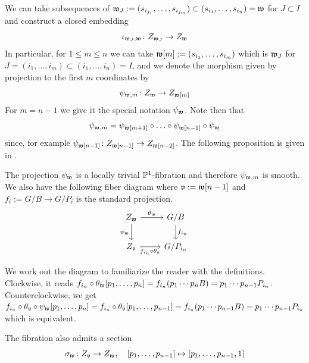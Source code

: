 \documentclass[12pt]{article}
\begin{document}
We can take subsequences of $\mathfrak{w}_J := (s_{i_{j_1}}, \ldots, s_{i_{j_m}}) \subset (s_{i_1}, \ldots, s_{i_n}) = \mathfrak{w}$ for $J \subset I$ and construct a closed embedding 
\begin{equation}\label{closedembedding}
    \iota_{\mathfrak{w}_J, \mathfrak{w}} \colon Z_{\mathfrak{w}_J} \rightarrow Z_{\mathfrak{w}}
\end{equation} 
In particular, for $1 \leq m \leq n$ we can take $\mathfrak{w}[m] := (s_{i_1}, \ldots, s_{i_m})$ which is $\mathfrak{w}_J$ for $J = (i_1,\ldots,i_m) \subset (i_1,\ldots,i_n) = I$, and we denote the morphism given by projection to the first $m$ coordinates by
\begin{equation}\label{fibration}
    \psi_{\mathfrak{w}, m} \colon Z_{\mathfrak{w}} \rightarrow Z_{\mathfrak{w}[m]}
\end{equation}
For $m = n-1$ we give it the special notation $\psi_{\mathfrak{w}}$. Note then that
\[\psi_{\mathfrak{w}, m} = \psi_{\mathfrak{w}[m+1]}\circ\ldots \circ\psi_{\mathfrak{w}[n-1]}\circ \psi_{\mathfrak{w}}\]
since, for example $\psi_{\mathfrak{w}[n-1]} \colon Z_{\mathfrak{w}[n-1]} \to Z_{\mathfrak{w}[n-2]}$.
The following proposition is given in \cite{Brion2004}.
\begin{prop}
    The projection $\psi_{\mathfrak{w}}$ is a locally trivial $\mathbb{P}^1$-fibration and therefore $\psi_{\mathfrak{w},m}$ is smooth. We also have the following fiber diagram where $\mathfrak{v} := \mathfrak{w}[n-1]$ and $f_{i} := G/B \to G/P_{i}$ is the standard projection.
    \[\begin{tikzcd}
	{Z_{\mathfrak{w}}} & {G/B} \\
	{Z_{\mathfrak{v}}} & {G/P_{i_n}}
	\arrow["{\theta_{\mathfrak{w}}}", from=1-1, to=1-2]
	\arrow["{\psi_{\mathfrak{w}}}"', from=1-1, to=2-1]
	\arrow["f_{i_n}", from=1-2, to=2-2]
	\arrow["{f_{i_n}\circ \theta_{\mathfrak{v}}}"', from=2-1, to=2-2]
\end{tikzcd}\]
\end{prop}
We work out the diagram to familiarize the reader with the definitions. Clockwise, it reads $f_{i_n} \circ \theta_{\mathfrak{w}}[p_1,\ldots,p_n] = f_{i_n}(p_1\cdots p_n B) = p_1\cdots p_{n-1} P_{i_n}$. Counterclockwise, we get $f_{i_n} \circ \theta_{\mathfrak{v}} \circ \psi_{\mathfrak{w}}[p_1,\ldots,p_n] = f_{i_n} \circ \theta_{\mathfrak{v}}[p_1,\ldots,p_{n-1}] = f_{i_n}(p_1\cdots p_{n-1} B) = p_1\cdots p_{n-1} P_{i_n}$ which is equivalent.

The fibration also admits a section
\begin{equation}\label{section}
    \sigma_{\mathfrak{w}} \colon Z_{\mathfrak{v}} \to Z_{\mathfrak{w}}, \quad [p_1,\ldots,p_{n-1}] \mapsto [p_1,\ldots,p_{n-1},1]
\end{equation}
\end{document}
